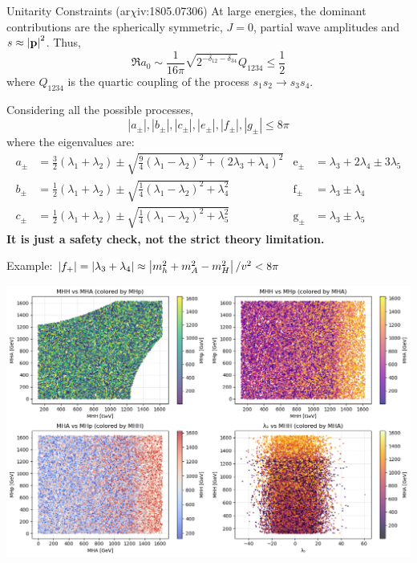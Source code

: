\documentclass{../bredelebeamer}
\newcommand{\arxiv}{ar$\chi$iv:}
\begin{document}
\begin{frame}{Unitarity Constraints (\arxiv 1805.07306)}
    At large energies, the dominant contributions are the spherically symmetric, $J=0$, partial wave amplitudes and $s\approx \abs{\mathbf{p}}^2$. Thus, 
    \begin{equation}
        \Re{a_0} \sim \frac{1}{16 \pi} \sqrt{2 ^{-\delta_{12}-\delta_{34}}} Q_{1234} \leq \frac{1}{2}
    \end{equation}
    where $Q_{1234} $ is the quartic coupling of the process $s_1 s_2 \rightarrow s_3 s_4$.


Considering all the possible processes, 
\begin{equation*}
|a_\pm|, |b_\pm|, |c_\pm|, |e_\pm|, |f_\pm|, |g_\pm| \leq 8\pi
\end{equation*}
where the eigenvalues are:
  {\small
  \begin{equation}
    \begin{aligned}
    a_{ \pm} & =\frac{3}{2}\left(\lambda_1+\lambda_2\right) \pm \sqrt{\frac{9}{4}\left(\lambda_1-\lambda_2\right)^2+\left(2 \lambda_3+\lambda_4\right)^2} &\mathrm{e}_{ \pm} & =\lambda_3+2 \lambda_4 \pm 3 \lambda_5 \\
    b_{ \pm} & =\frac{1}{2}\left(\lambda_1+\lambda_2\right) \pm \sqrt{\frac{1}{4}\left(\lambda_1-\lambda_2\right)^2+\lambda_4^2} & \mathrm{f}_{ \pm} & =\lambda_3 \pm \lambda_4 \\
    c_{ \pm} & =\frac{1}{2}\left(\lambda_1+\lambda_2\right) \pm \sqrt{\frac{1}{4}\left(\lambda_1-\lambda_2\right)^2+\lambda_5^2} & \mathrm{g}_{ \pm} & =\lambda_3 \pm \lambda_5
    \end{aligned}
  \end{equation}
  }
  \textbf{It is just a safety check, not the strict theory limitation.}
\end{frame}

\begin{frame}{Example: $\abs{f_+}=\abs{\lambda_3 + \lambda_4}\approx \left| m_h^2 + m_A^2 - m_{H}^2 \right|/v^2  < 8\pi$}
  \begin{center}
    \includegraphics[width=\textwidth]{unitarity_f_plus_THDM_param_scan_analysis}
  \end{center}
    
\end{frame}
\end{document}
